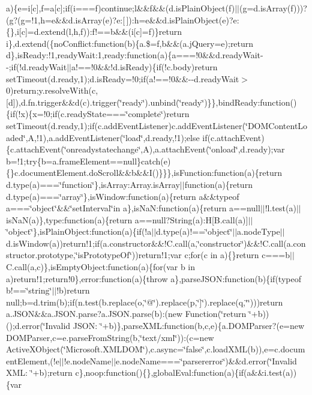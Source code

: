 a)\{e=i[c],f=a[c];if(i===f)continue;l\&\&f\&\&(d.\-is\-Plain\-Object(f)$|$$|$(g=d.\-is\-Array(f)))?(g?(g=!1,h=e\&\&d.\-is\-Array(e)?e\-:[$\,$])\-:h=e\&\&d.\-is\-Plain\-Object(e)?e\-:\{\},i[c]=d.\-extend(l,h,f))\-:f!==b\&\&(i[c]=f)\}return i\},d.\-extend(\{no\-Conflict\-:function(b)\{a.\$=f,b\&\&(a.\-j\-Query=e);return d\},is\-Ready\-:!1,ready\-Wait\-:1,ready\-:function(a)\{a===!0\&\&d.\-ready\-Wait-\/-\/;if(!d.\-ready\-Wait$|$$|$a!==!0\&\&!d.\-is\-Ready)\{if(!c.\-body)return set\-Timeout(d.\-ready,1);d.\-is\-Ready=!0;if(a!==!0\&\&-\/-\/d.\-ready\-Wait$>$0)return;y.\-resolve\-With(c,[d]),d.\-fn.\-trigger\&\&d(c).\-trigger(\char`\"{}ready\char`\"{}).\-unbind(\char`\"{}ready\char`\"{})\}\},bind\-Ready\-:function()\{if(!x)\{x=!0;if(c.\-ready\-State===\char`\"{}complete\char`\"{})return set\-Timeout(d.\-ready,1);if(c.\-add\-Event\-Listener)c.\-add\-Event\-Listener(\char`\"{}\-D\-O\-M\-Content\-Loaded\char`\"{},\-A,!1),a.\-add\-Event\-Listener(\char`\"{}load\char`\"{},d.\-ready,!1);else if(c.\-attach\-Event)\{c.\-attach\-Event(\char`\"{}onreadystatechange\char`\"{},\-A),a.\-attach\-Event(\char`\"{}onload\char`\"{},d.\-ready);var b=!1;try\{b=a.\-frame\-Element==null\}catch(e)\{\}c.\-document\-Element.\-do\-Scroll\&\&b\&\&\-I()\}\}\},is\-Function\-:function(a)\{return d.\-type(a)===\char`\"{}function\char`\"{}\},is\-Array\-:\-Array.\-is\-Array$|$$|$function(a)\{return d.\-type(a)===\char`\"{}array\char`\"{}\},is\-Window\-:function(a)\{return a\&\&typeof a===\char`\"{}object\char`\"{}\&\&\char`\"{}set\-Interval\char`\"{}in a\},is\-Na\-N\-:function(a)\{return a==null$|$$|$!l.\-test(a)$|$$|$is\-Na\-N(a)\},type\-:function(a)\{return a==null?\-String(a)\-:\-H[\-B.\-call(a)]$|$$|$\char`\"{}object\char`\"{}\},is\-Plain\-Object\-:function(a)\{if(!a$|$$|$d.\-type(a)!==\char`\"{}object\char`\"{}$|$$|$a.\-node\-Type$|$$|$d.\-is\-Window(a))return!1;if(a.\-constructor\&\&!\-C.\-call(a,\char`\"{}constructor\char`\"{})\&\&!\-C.\-call(a.\-constructor.\-prototype,\char`\"{}is\-Prototype\-Of\char`\"{}))return!1;var c;for(c in a)\{\}return c===b$|$$|$\-C.\-call(a,c)\},is\-Empty\-Object\-:function(a)\{for(var b in a)return!1;return!0\},error\-:function(a)\{throw a\},parse\-J\-S\-O\-N\-:function(b)\{if(typeof b!==\char`\"{}string\char`\"{}$|$$|$!b)return null;b=d.\-trim(b);if(n.\-test(b.\-replace(o,\char`\"{}@\char`\"{}).\-replace(p,\char`\"{}]\char`\"{}).\-replace(q,\char`\"{}\char`\"{})))return a.\-J\-S\-O\-N\&\&a.\-J\-S\-O\-N.\-parse?a.\-J\-S\-O\-N.\-parse(b)\-:(new Function(\char`\"{}return \char`\"{}+b))();d.\-error(\char`\"{}\-Invalid J\-S\-O\-N\-: \char`\"{}+b)\},parse\-X\-M\-L\-:function(b,c,e)\{a.\-D\-O\-M\-Parser?(e=new D\-O\-M\-Parser,c=e.\-parse\-From\-String(b,\char`\"{}text/xml\char`\"{}))\-:(c=new Active\-X\-Object(\char`\"{}\-Microsoft.\-X\-M\-L\-D\-O\-M\char`\"{}),c.\-async=\char`\"{}false\char`\"{},c.\-load\-X\-M\-L(b)),e=c.\-document\-Element,(!e$|$$|$!e.\-node\-Name$|$$|$e.\-node\-Name===\char`\"{}parsererror\char`\"{})\&\&d.\-error(\char`\"{}\-Invalid X\-M\-L\-: \char`\"{}+b);return c\},noop\-:function()\{\},global\-Eval\-:function(a)\{if(a\&\&i.\-test(a))\{var 